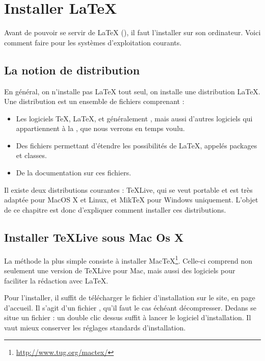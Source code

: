 \chapter {Installer \LaTeX{}}\label{install}

\begin{intro}
    Avant de pouvoir se servir de \LaTeX{} (\XeLaTeX), il faut l'installer sur son ordinateur. Voici comment faire pour les systèmes d'exploitation courants.
\end{intro}

\section{La notion de distribution}

En général, on n'installe pas \LaTeX{} tout seul, on installe une distribution \LaTeX{}. Une distribution est un ensemble de fichiers comprenant :
\begin{itemize}
\item Les logiciels \TeX, \LaTeX, et généralement \XeLaTeX, mais aussi d'autres logiciels qui appartiennent à la  , que nous verrons en temps voulu.
\item Des fichiers permettant d'étendre les possibilités de \LaTeX, appelés packages et classes.
\item De la documentation sur ces fichiers.
\end{itemize}

Il existe deux distributions courantes : TeXLive, qui se veut portable et est très adaptée pour MacOS X et Linux, et MikTeX pour Windows uniquement. L'objet de ce chapitre est donc d'expliquer comment installer ces distributions.

\section{Installer TeXLive sous Mac Os X}

La méthode la plus simple consiste à installer MacTeX\footnote{\url{http://www.tug.org/mactex/}}. Celle-ci comprend non seulement une version de TeXLive pour Mac, mais aussi des logiciels pour faciliter la rédaction avec \LaTeX{}.

Pour l'installer, il suffit de télécharger le fichier d'installation sur le site, en page d'accueil. Il s'agit d'un fichier , qu'il faut le cas échéant décompresser. Dedans se situe un fichier  : un double clic dessus suffit à lancer le logiciel d'installation. Il vaut mieux conserver les réglages standards d'installation.

